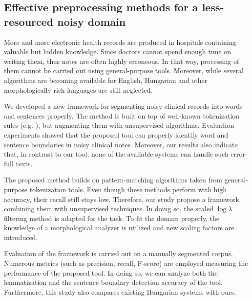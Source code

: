\subsection{Effective preprocessing methods for a less-resourced noisy domain}
\label{thes:clin}

More and more electronic health records are produced in hospitals containing valuable but hidden knowledge.
Since doctors cannot spend enough time on writing them, thus notes are often highly erroneous.
In that way, processing of them cannot be carried out using general-purpose tools.
Moreover, while several algorithms are becoming available for English, Hungarian and other morphologically rich languages are still neglected.

\begin{core}
\begin{thesis}%
\label{thes:clin-segment}
We developed a new framework for segmenting noisy clinical records into words and sentences properly.
The method is built on top of well-known tokenization rules (e.g. \cite{Halacsy2004}), but augmenting them with unsupervised algorithms.
Evaluation experiments showed that the proposed tool can properly identify word and sentence boundaries in noisy clinical notes. 
Moreover, our results also indicate that, in contrast to our tool, none of the available systems can handle such error-full texts.
\end{thesis}

\begin{pub}
\cite{Orosz2013d, Orosz2014a}
\end{pub}
\end{core}


The proposed method builds on pattern-matching algorithms taken from general-purpose tokenization tools.
Even though these methods perform with high accuracy, their recall still stays low.
Therefore, our study propose a framework combining them with unsupervised techniques.
In doing so, the scaled $\log\lambda$ filtering method \cite{kiss2006unsupervised} is adapted for the task.
To fit the domain properly, the knowledge of a morphological analyzer is utilized and new scaling factors are introduced.

Evaluation of the framework is carried out on a manually segmented corpus. 
Numerous metrics (such as precision, recall, F-score) are employed measuring the performance of the proposed tool.
In doing so, we can analyze both the lemmatization and the sentence boundary detection accuracy of the tool.
Furthermore, this study also compares existing Hungarian systems with ours.

